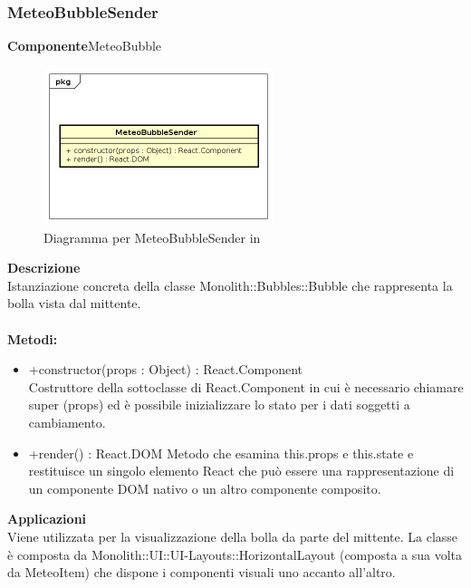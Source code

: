 \subsubsection{MeteoBubbleSender}
\textbf{Componente}MeteoBubble\\
   \FloatBarrier
   \begin{figure}[ht]
   \centering
   \includegraphics[width=0.6\textwidth]{img/single-MeteoBubbleSender}
   \caption{{Diagramma per MeteoBubbleSender in }}
\end{figure}
\FloatBarrier
\textbf{Descrizione}\\
Istanziazione concreta della classe Monolith::Bubbles::Bubble che rappresenta la bolla vista dal mittente.
\\
\\
\textbf{Metodi:} 
\begin{itemize}
\item +constructor(props : Object) : React.Component 
\\
Costruttore della sottoclasse di React.Component in cui è necessario chiamare super (props) ed è possibile inizializzare lo stato per i dati soggetti a cambiamento.

\item +render() : React.DOM
Metodo che esamina this.props e this.state e restituisce un singolo elemento React che può essere una rappresentazione di un componente DOM nativo o un altro componente composito.

\end{itemize} 


\textbf{Applicazioni}\\
Viene utilizzata per la visualizzazione della bolla da parte del mittente.
La classe è composta da Monolith::UI::UI-Layouts::HorizontalLayout (composta a sua volta da MeteoItem) che dispone i componenti visuali uno accanto all'altro. 


\clearpage


